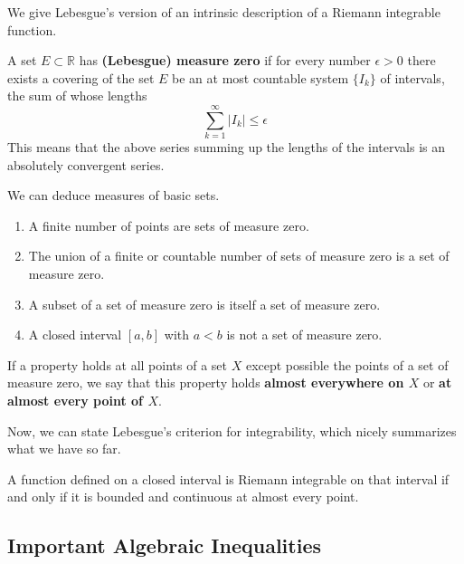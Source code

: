   We give Lebesgue's version of an intrinsic description of a Riemann integrable function. 

  \begin{definition}[Measure]
    A set $E \subset \mathbb{R}$ has \textbf{(Lebesgue) measure zero} if for every number $\epsilon > 0$ there exists a covering of the set $E$ be an at most countable system $\{I_k\}$ of intervals, the sum of whose lengths 
    \[\sum_{k=1}^\infty |I_k| \leq \epsilon\]
    This means that the above series summing up the lengths of the intervals is an absolutely convergent series. 
  \end{definition}

  \begin{lemma}
    We can deduce measures of basic sets. 
    \begin{enumerate}
      \item A finite number of points are sets of measure zero. 
      \item The union of a finite or countable number of sets of measure zero is a set of measure zero. \item A subset of a set of measure zero is itself a set of measure zero. 
      \item A closed interval $[a, b]$ with $a<b$ is not a set of measure zero. 
    \end{enumerate}
  \end{lemma}

  \begin{definition}
    If a property holds at all points of a set $X$ except possible the points of a set of measure zero, we say that this property holds \textbf{almost everywhere on $X$} or \textbf{at almost every point of $X$}. 
  \end{definition}

  Now, we can state Lebesgue's criterion for integrability, which nicely summarizes what we have so far. 

  \begin{theorem}
  A function defined on a closed interval is Riemann integrable on that interval if and only if it is bounded and continuous at almost every point. 
  \end{theorem}

\subsection{Important Algebraic Inequalities}

